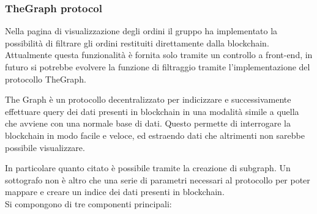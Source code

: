 

\subsubsection{TheGraph protocol}

Nella pagina di visualizzazione degli ordini il gruppo ha implementato la possibilità di filtrare gli ordini restituiti direttamente dalla blockchain. Attualmente questa funzionalità è fornita solo tramite un controllo a front-end, in futuro si potrebbe evolvere la funzione di filtraggio tramite l'implementazione del protocollo TheGraph\glo.

The Graph è un protocollo decentralizzato per indicizzare e successivamente effettuare query dei dati presenti in blockchain in una modalità simile a quella che avviene con una normale base di dati. Questo permette di interrogare la blockchain in modo facile e veloce, ed estraendo dati che altrimenti non sarebbe possibile visualizzare.

In particolare quanto citato è possibile tramite la creazione di subgraph. Un sottografo non è altro che una serie di parametri necessari al protocollo per poter mappare e creare un indice dei dati presenti in blockchain.\\
Si compongono di tre componenti principali:

